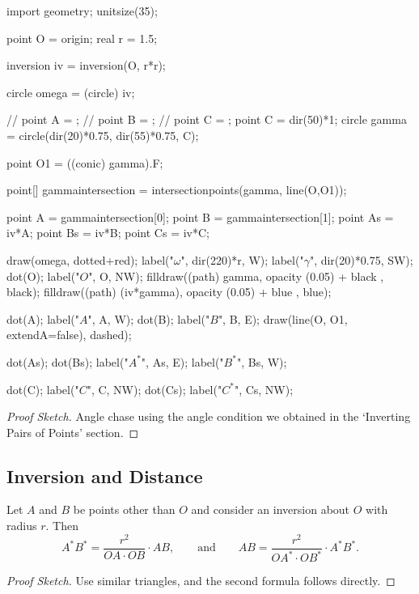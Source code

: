 \documentclass[]{scrartcl}
\begin{document}
\begin{minipage}{.5\textwidth}
	\begin{center}
		\begin{asy}
			import geometry;
			unitsize(35);
		
			point O = origin;
			real r = 1.5;
		
			inversion iv = inversion(O, r*r);
		
			circle omega = (circle) iv;
		
			// point A = ;
			// point B = ;
			// point C = ;
			point C = dir(50)*1;
			circle gamma = circle(dir(20)*0.75, dir(55)*0.75, C);

			point O1 = ((conic) gamma).F;

			point[] gammaintersection = intersectionpoints(gamma, line(O,O1));

			point A = gammaintersection[0];
			point B = gammaintersection[1];
			point As = iv*A;
			point Bs = iv*B;
			point Cs = iv*C;
			
			draw(omega, dotted+red);
			label("$\omega$", dir(220)*r, W);
			label("$\gamma$", dir(20)*0.75, SW);
			dot(O); label("$O$", O, NW);
			filldraw((path) gamma, opacity (0.05) + black , black);
			filldraw((path) (iv*gamma), opacity (0.05) + blue , blue);

			dot(A); label("$A$", A, W);
			dot(B); label("$B$", B, E);
			draw(line(O, O1, extendA=false), dashed);

			dot(As); dot(Bs);
			label("$A^*$", As, E);
			label("$B^*$", Bs, W);

			dot(C); label("$C$", C, NW);
			dot(Cs); label("$C^*$", Cs, NW);
			\end{asy}
	\end{center}
\end{minipage}

\begin{proof}[Proof Sketch]
	Angle chase using the angle condition we obtained in the `Inverting Pairs of Points' section.
\end{proof}


\subsection*{Inversion and Distance}

Let $A$ and $B$ be points other than $O$ and consider an inversion about $O$ with radius $r$. Then
$$
A^* B^*  = \frac{r^2}{OA \cdot OB} \cdot AB, \quad \quad \text{and} \quad \quad AB = \frac{r^2}{OA^* \cdot OB^*} \cdot A^* B^*.
$$
\begin{proof}[Proof Sketch]
	Use similar triangles, and the second formula follows directly.
\end{proof}
\end{document}
